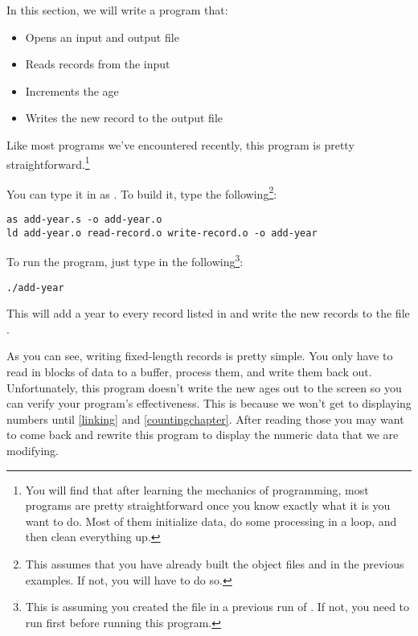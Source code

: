 In this section, we will write a program that:

\begin{itemize}\item Opens an input and output file 
\item Reads records from the input 
\item Increments the age 
\item Writes the new record to the output file 
\end{itemize}

Like most programs we've encountered recently, this program is 
pretty straightforward.\footnote{You will find that after learning
the mechanics of programming, most programs are pretty straightforward
once you know exactly what it is you want to do.  Most of them initialize
data, do some processing in a loop, and then clean everything up.}

\begin{simpletyping}

\end{simpletyping}

You can type it in as .  To build it, type
the following\footnote{This assumes that you have already built
the object files  and 
 in the previous examples.  If not,
you will have to do so.}:

\begin{simpletyping}
\begin{lstlisting}
as add-year.s -o add-year.o
ld add-year.o read-record.o write-record.o -o add-year
\end{lstlisting}
\end{simpletyping}

To run the program, just type in the following\footnote{This is assuming you created the file in a previous run of 
.  If not, you need to run 
 first before running this 
program.}:

\begin{simpletyping}
\begin{lstlisting}
./add-year
\end{lstlisting}
\end{simpletyping}

This will add a year to every record listed in 
and write the new records to the file .

As you can see, writing fixed-length records is pretty simple.  You 
only have to read in blocks of data to a buffer, process them, and write
them back out.  Unfortunately, this program doesn't write the new ages
out to the screen so you can verify your program's effectiveness.  This is because we
won't get to displaying numbers until \autoref{linking} and
\autoref{countingchapter}.
After reading those you may want to come back and rewrite this program to
display the numeric data that we are modifying.

